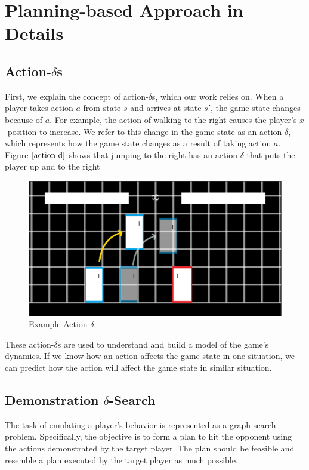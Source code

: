 
\chapter{Planning-based Approach in Details}

\label{Chapter4} %


\section{Action-$\delta$s}
First, we explain the concept of action-$\delta$s, which our work relies on. When a player takes action $a$ from state $s$ and arrives at state $s'$, the game state changes because of $a$. For example, the action of walking to the right causes the player's $x$-position to increase. We refer to this change in the game state as an action-$\delta$, which represents how the game state changes as a result of taking action $a$. Figure $\ref{action-d}$ shows that jumping to the right has an action-$\delta$ that puts the player up and to the right

\begin{figure}[h]
	\centering
	\includegraphics[width=\textwidth]{Figures/ActionDelta.png}
	\caption{Example Action-$\delta$}
	\label{action-d}
\end{figure}

These action-$\delta$s are used to understand and build a model of the game's dynamics. If we know how an action affects the game state in one situation, we can predict how the action will affect the game state in similar situation. 

\section{Demonstration $\delta$-Search}
The task of emulating a player's behavior is represented as a graph search problem. Specifically, the objective is to form a plan to hit the opponent using the actions demonstrated by the target player. The plan should be feasible and resemble a plan executed by the target player as much possible.

